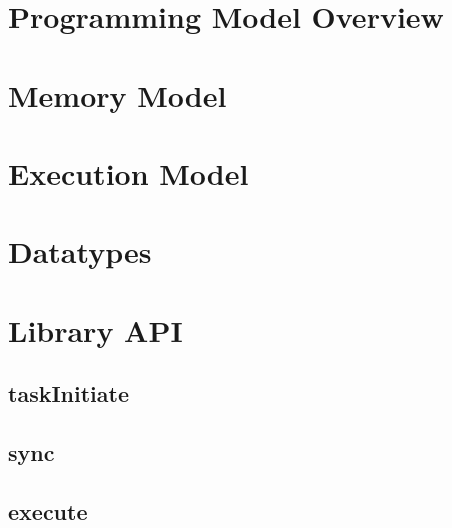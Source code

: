 \documentclass[10pt]{book}
\begin{document}





%

\section{Programming Model Overview}\label{subsec:programming_model}


\section{Memory Model}\label{subsec:memory_model}


\section{Execution Model}\label{subsec:execution_model}


\section{Datatypes}\label{subsec:datatypes}


\clearpage

\section{\qcor Library API}\label{sec:qcor_library_api}
\subsection{\textbf{taskInitiate}}\label{subsec:taskInitiate}


\subsection{\textbf{sync}}\label{subsec:sync}


\subsection{\textbf{execute}}\label{subsec:execute}

\end{document}

